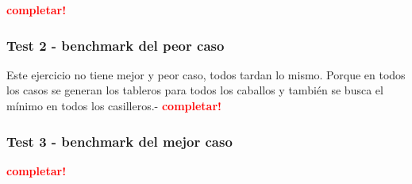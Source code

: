 \textcolor{red}{\textbf{completar!}}


\newpage
\subsubsection{Test 2 - benchmark del peor caso}

Este ejercicio no tiene mejor y peor caso, todos tardan lo mismo.
Porque en todos los casos se generan los tableros para todos los caballos
y también se busca el mínimo en todos los casilleros.-
\textcolor{red}{\textbf{completar!}}


\newpage
\subsubsection{Test 3 - benchmark del mejor caso}

\textcolor{red}{\textbf{completar!}}
